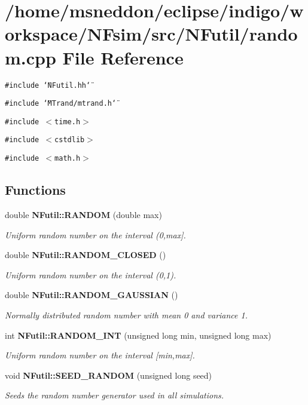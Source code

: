 \section{/home/msneddon/eclipse/indigo/workspace/NFsim/src/NFutil/random.cpp File Reference}
\label{random_8cpp}


{\tt \#include \char`\"{}NFutil.hh\char`\"{}}\par
{\tt \#include \char`\"{}MTrand/mtrand.h\char`\"{}}\par
{\tt \#include $<$time.h$>$}\par
{\tt \#include $<$cstdlib$>$}\par
{\tt \#include $<$math.h$>$}\par
\subsection*{Functions}
\begin{CompactItemize}
\item 
double {\bf NFutil::RANDOM} (double max)
\begin{CompactList}\small\item\em Uniform random number on the interval (0,max]. \item\end{CompactList}\item 
double {\bf NFutil::RANDOM\_\-CLOSED} ()
\begin{CompactList}\small\item\em Uniform random number on the interval (0,1). \item\end{CompactList}\item 
double {\bf NFutil::RANDOM\_\-GAUSSIAN} ()
\begin{CompactList}\small\item\em Normally distributed random number with mean 0 and variance 1. \item\end{CompactList}\item 
int {\bf NFutil::RANDOM\_\-INT} (unsigned long min, unsigned long max)
\begin{CompactList}\small\item\em Uniform random number on the interval [min,max]. \item\end{CompactList}\item 
void {\bf NFutil::SEED\_\-RANDOM} (unsigned long seed)
\begin{CompactList}\small\item\em Seeds the random number generator used in all simulations. \item\end{CompactList}\end{CompactItemize}
